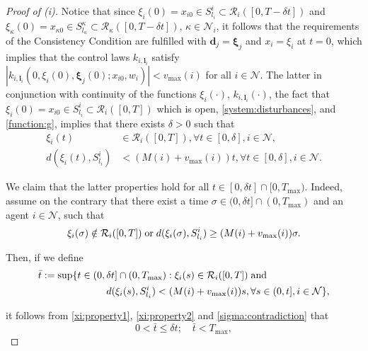 \documentclass[reqno]{amsart}
\theoremstyle{plain}
\theoremstyle{definition}
\numberwithin{equation}{section}
\begin{document}
\begin{proof}[Proof of (i)]
Notice that since $\xi_i(0)=x_{i0}\in S_{l_i}^i\subset {\ensuremath{\mathcal{R}}}_i([0,T-\delta t])$ and $\xi_{\kappa}(0)=x_{\kappa 0}\in S_{l_{\kappa}}^{\kappa}\subset {\ensuremath{\mathcal{R}}}_{\kappa}([0,T-\delta t])$, $\kappa\in{\ensuremath{\mathcal{N}}}_i$, it follows that the requirements of the Consistency Condition are fulfilled with ${\textbf{{d}}}_j={\ensuremath{\boldsymbol{{\xi}}}}_j$ and $x_i=\xi_i$ at $t=0$, which implies that the control laws $k_{i,{\textbf{{l}}}_i}$ satisfy $|k_{i,{\textbf{{l}}}_i}(0,\xi_i(0),{\ensuremath{\boldsymbol{{\xi}}}}_j(0);x_{i0},w_i)|<v_{\max}(i)$ for all $i\in{\ensuremath{\mathcal{N}}}$. The latter in conjunction with continuity of the functions $\xi_i(\cdot)$,  $k_{i,{\textbf{{l}}}_i}(\cdot)$, the fact that $\xi_i(0)=x_{i0}\in S_{l_i}^i\subset {\ensuremath{\mathcal{R}}}_i([0,T])$ which is open, \eqref{system:disturbances}, and \eqref{function:g}, implies that there exists $\delta>0$ such that 
\begin{align}
\xi_i(t) & \in{\ensuremath{\mathcal{R}}}_i([0,T]), \forall t\in[0,\delta],i\in{\ensuremath{\mathcal{N}}}, \label{xi:property1} \\
d(\xi_i(t),S_{l_i}^i) & < (M(i)+v_{\max}(i))t, \forall t\in[0,\delta],i\in{\ensuremath{\mathcal{N}}}. \label{xi:property2}
\end{align}

\noindent We claim that the latter properties hold for all  $t\in[0,\delta t]\cap[0,T_{\max})$. Indeed, assume on the contrary that there exist a time $\sigma\in(0,\delta t]\cap(0,T_{\max})$ and an agent $i\in{\ensuremath{\mathcal{N}}}$, such that  
\begin{equation} \label{sigma:contradiction}
\xi_i(\sigma)\notin{\ensuremath{\mathcal{R}}}_i([0,T])\;{\rm or}\; d(\xi_i(\sigma),S_{l_i}^i) \ge (M(i)+v_{\max}(i))\sigma.
\end{equation}

\noindent Then, if we define 
\begin{align} 
\bar{t}:=\sup\{t\in(0,\delta t]\cap(0,T_{\max}):\xi_i(s) & \in{\ensuremath{\mathcal{R}}}_i([0,T])\;{\rm and}\; \nonumber \\
d(\xi_i(s),S_{l_i}^i)< (M(i) & +v_{\max}(i))s,\forall s\in(0,t],i\in{\ensuremath{\mathcal{N}}}\}, \label{time:tbar}
\end{align}

\noindent it follows from \eqref{xi:property1}, \eqref{xi:property2} and \eqref{sigma:contradiction} that 
\begin{equation} \label{tbar:properties}
0<\bar{t}\le\delta t;\quad \bar{t}<T_{\max},
\end{equation}


\end{proof}
\end{document}
